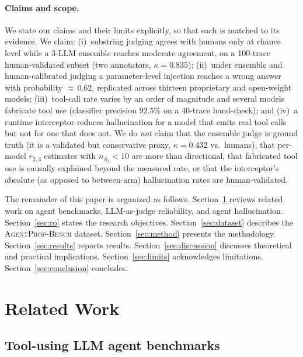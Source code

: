 \documentclass{ieeeaccess}
\newcommand{\bench}{\textsc{AgentProp-Bench}\xspace}
\begin{document}
\paragraph{Claims and scope.}
We state our claims and their limits explicitly, so that each is matched to its
evidence. We claim: (i)~substring judging agrees with humans only at chance
level while a 3-LLM ensemble reaches moderate agreement, on a 100-trace
human-validated subset (two annotators, $\kappa{=}0.835$); (ii)~under
ensemble and human-calibrated judging a parameter-level injection reaches a
wrong answer with probability ${\approx}\,0.62$, replicated across thirteen
proprietary and open-weight models; (iii)~tool-call rate varies by an order of
magnitude and several models fabricate tool use (classifier precision
$92.5\%$ on a 40-trace hand-check); and (iv)~a runtime interceptor reduces
hallucination for a model that emits real tool calls but not for one that does
not. We do \emph{not} claim that the ensemble judge is ground truth (it is a
validated but conservative proxy, $\kappa{=}0.432$ vs.\ humans), that per-model
$r_{2,3}$ estimates with $n_{S_2}{<}10$ are more than directional, that
fabricated tool use is causally explained beyond the measured rate, or that the
interceptor's absolute (as opposed to between-arm) hallucination rates are
human-validated.

The remainder of this paper is organized as follows.
Section~\ref{sec:related} reviews related work on agent benchmarks,
LLM-as-judge reliability, and agent hallucination.
Section~\ref{sec:ro} states the research objectives.
Section~\ref{sec:dataset} describes the \bench{} dataset.
Section~\ref{sec:method} presents the methodology.
Section~\ref{sec:results} reports results.
Section~\ref{sec:discussion} discusses theoretical and practical
implications.
Section~\ref{sec:limits} acknowledges limitations.
Section~\ref{sec:conclusion} concludes.


\section{Related Work}
\label{sec:related}

\subsection{Tool-using LLM agent benchmarks}
\end{document}
